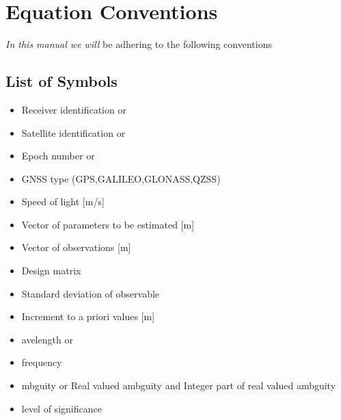 \chapter{Equation Conventions}
\label{ch:conventions}

\textit{In this manual we will} be adhering to the following conventions

\section{List of Symbols}

\begin{itemize}
	\item {\LARGE{}} Receiver identification or {\LARGE{}}
	\item {\LARGE{}} Satellite identification or {\LARGE{}}
	\item {\LARGE{}} Epoch number or {\LARGE{}}
	\item {\LARGE{}} GNSS type (GPS,GALILEO,GLONASS,QZSS)
	\item {\LARGE{}} Speed of light [m/s]
	\item {\LARGE{}} Vector of parameters to be estimated [m]
	\item {\LARGE{}} Vector of observations [m]
	\item {\LARGE{}} Design matrix
	\item {\LARGE{\boldmath{$\sigma$}}} Standard deviation of observable
	\item {\LARGE{\boldmath{$\Delta$}}} Increment to a priori values [m]
	\item {\LARGE{\boldmath{$\omega$}}}avelength or {\LARGE{}}
	\item {\LARGE{}} frequency
	\item {\LARGE{\boldmath{$\alpha$}}}mbguity or {\LARGE{}} Real valued ambguity and {\LARGE{}} Integer part of real valued ambguity
	\item {\LARGE{\boldmath{$\alpha$}}} level of significance
	

\end{itemize}
